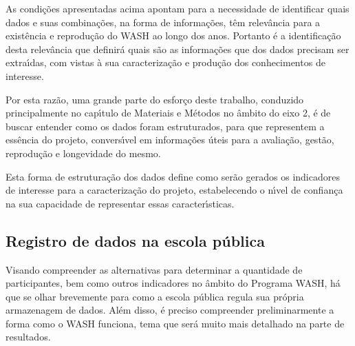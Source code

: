 \documentclass[
12pt,		%
openright,	%
twoside,  %
a4paper,			%
chapter=TITLE,		%
english,			%
french,				%
spanish,			%
brazil				%
]{USPSC-classe/USPSC}
\begin{document}
As condi\c{c}\~oes apresentadas acima apontam para a necessidade de identificar quais dados e suas combina\c{c}\~oes, na forma de informa\c{c}\~oes, t\^em relev\^ancia para a exist\^encia e reprodu\c{c}\~ao do WASH ao longo dos anos. Portanto \'e a identifica\c{c}\~ao desta relev\^ancia que definir\'a quais s\~ao as informa\c{c}\~oes que dos dados precisam ser extra\'{\i}das, com vistas \`a sua caracteriza\c{c}\~ao e produ\c{c}\~ao dos conhecimentos de interesse.

















Por esta raz\~ao, uma grande parte do esfor\c{c}o deste trabalho, conduzido principalmente no cap\'{\i}tulo de Materiais e M\'etodos no \^ambito do eixo 2, \'e de buscar entender como os dados foram estruturados, para que representem a ess\^encia do projeto, convers\'{\i}vel em informa\c{c}\~oes \'uteis para a avalia\c{c}\~ao, gest\~ao, reprodu\c{c}\~ao e longevidade do mesmo.

















Esta forma de estrutura\c{c}\~ao dos dados define como ser\~ao gerados os indicadores de interesse para a caracteriza\c{c}\~ao do projeto, estabelecendo o n\'{\i}vel de confian\c{c}a na sua capacidade de representar essas caracter\'{\i}sticas.

















\subsection[Registro de dados na escola p\'ublica]{Registro de dados na escola p\'ublica}\label{Registro de dados na escola p\'ublica}
Visando compreender as alternativas para determinar a quantidade de participantes, bem como outros indicadores no \^ambito do Programa WASH, h\'a que se olhar brevemente para como a escola p\'ublica regula sua pr\'opria armazenagem de dados. Al\'em disso, \'e preciso compreender preliminarmente a forma como o WASH funciona, tema que ser\'a muito mais detalhado na parte de resultados.
\end{document}
